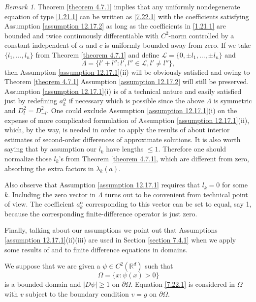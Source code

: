 \documentclass[11pt, reqno]{amsart}
\theoremstyle{definition}
\theoremstyle{remark}
\newtheorem{remark}{Remark}[section]
\begin{document}
\begin{remark}
                                \label{remark 7.29.1}
Theorem \ref{theorem 4.7.1} implies that
any uniformly nondegenerate equation
of type \eqref{1.21.1} can be written as 
\eqref{7.22.1} with the coefficients
satisfying Assumption \ref{assumption 12.17.2}
as long as the coefficients in \eqref{1.21.1}
are bounded and twice continuously differentiable
with $C^{2}$-norm controlled by a constant
independent of $\alpha$ and $c$ is uniformly 
bounded away from zero. If we take
$ \{l_{1},...,l_{n}\}$ from Theorem \ref{theorem 4.7.1}
and define ${\mathcal{L}}=\{0,\pm l_{1},...,\pm l_{n}\}$ and
$$
\Lambda=\{l'+l'':l',l''\in{\mathcal{L}},l'\ne l'' 
 \},
$$
then Assumption \ref{assumption 12.17.1}(ii)
will be obviously satisfied and owing to Theorem
\ref{theorem 4.7.1} Assumption \ref{assumption 12.17.2}
will still be preserved. Assumption \ref{assumption 12.17.1}(i)
is of a technical nature and easily satisfied just by redefining
$a^{\alpha}_{k}$ if necessary
 which is possible since the above $\Lambda$
is symmetric and  $D^{2}_{l }=
D^{2}_{-l }$. One could exclude 
Assumption \ref{assumption 12.17.1}(i) on the expense
of more complicated formulation
of Assumption \ref{assumption 12.17.1}(ii), which, by the way,
is needed in order to apply the results
of \cite{Kr12.2} about interior estimates
of second-order differences of approximate solutions.
It is also worth saying that by assumption our
$l_{k}$ have lengths $\leq1$. Therefore one should
normalize those $l_{k}$'s from Theorem \ref{theorem 4.7.1},
which are different from zero,
absorbing the extra factors in $\lambda_{k}(a)$.

Also observe that Assumption \ref{assumption 12.17.1} 
requires that $l_{k}=0$ for some $k$.
 Including the zero vector in $\Lambda$
turns out to be  convenient from technical point of view. The coefficient
$a^{\alpha}_{k}$ corresponding to this vector can be set to equal,
say 1, because the corresponding finite-difference operator is just zero.

Finally, talking about our assumptions we point out that
  Assumptions  \ref{assumption 12.17.1}(ii)(iii) 
are used in Section \ref{section 7.4.1}
when we apply some results of
\cite{Kr12.1} and \cite{Kr12.2} to finite difference
equations in domains.
\end{remark}  

We suppose that we are given a $\psi\in C^{2}({\mathbb{R}}^{d})$  
such that
$$
\Omega=\{x:\psi(x)>0\}
$$
is a bounded domain and $| D \psi|\geq1$ on $\partial \Omega$.
Equation \eqref{7.22.1} is considered in $\Omega$
with $v$ subject to the   boundary condition $v=g$
on $\partial\Omega$.
\end{document}
